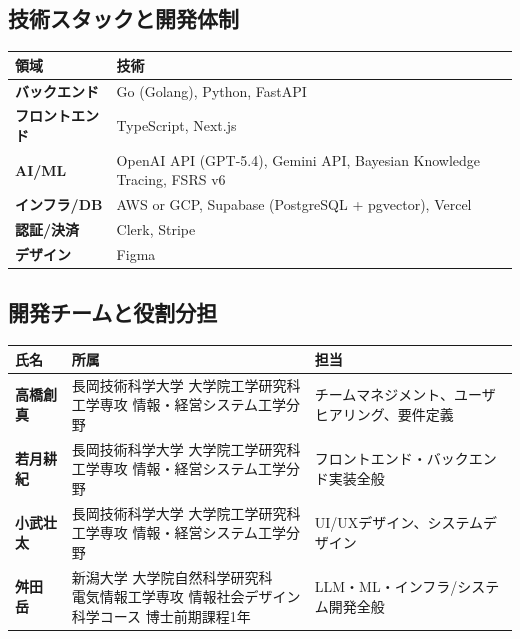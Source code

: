 \documentclass[paper=a4,fontsize=10.5bp,jafontsize=10.5bp,twocolumn]{jlreq}
\begin{document}
\subsection{技術スタックと開発体制}


\begin{footnotesize}\noindent
\begin{tabularx}{\linewidth}{>{\bfseries}l X}
\toprule
領域 & 技術 \\
\midrule
バックエンド & Go (Golang), Python, FastAPI \\
フロントエンド & TypeScript, Next.js \\
AI/ML & OpenAI API (GPT-5.4), Gemini API, Bayesian Knowledge Tracing, FSRS v6 \\
インフラ/DB & AWS or GCP, Supabase (PostgreSQL + pgvector), Vercel \\
認証/決済 & Clerk, Stripe \\
デザイン & Figma \\
\bottomrule
\end{tabularx}
\end{footnotesize}

\subsection{開発チームと役割分担}


\begin{footnotesize}\noindent
\begin{tabularx}{\linewidth}{>{\bfseries}l l X}
\toprule
氏名 & 所属 & 担当 \\
\midrule
高橋創真 & \parbox[t]{3.5cm}{長岡技術科学大学 大学院工学研究科\\工学専攻 情報・経営システム工学分野} & チームマネジメント、ユーザヒアリング、要件定義 \\[6pt]
若月耕紀 & \parbox[t]{3.5cm}{長岡技術科学大学 大学院工学研究科\\工学専攻 情報・経営システム工学分野} & フロントエンド・バックエンド実装全般 \\[6pt]
小武壮太 & \parbox[t]{3.5cm}{長岡技術科学大学 大学院工学研究科\\工学専攻 情報・経営システム工学分野} & UI/UXデザイン、システムデザイン \\[6pt]
舛田　岳 & \parbox[t]{3.5cm}{新潟大学 大学院自然科学研究科\\電気情報工学専攻 情報社会デザイン科学コース 博士前期課程1年} & LLM・ML・インフラ/システム開発全般 \\
\bottomrule
\end{tabularx}
\end{footnotesize}
\end{document}
